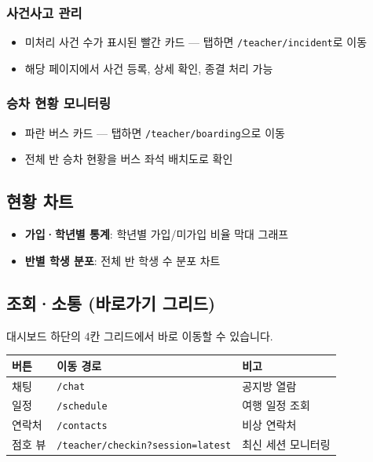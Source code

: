 \documentclass[a4paper,11pt]{article}
\begin{document}
\subsubsection{사건사고 관리}

\begin{itemize}
  \item 미처리 사건 수가 표시된 빨간 카드 — 탭하면 \texttt{/teacher/incident}로 이동
  \item 해당 페이지에서 사건 등록, 상세 확인, 종결 처리 가능
\end{itemize}

\subsubsection{승차 현황 모니터링}

\begin{itemize}
  \item 파란 버스 카드 — 탭하면 \texttt{/teacher/boarding}으로 이동
  \item 전체 반 승차 현황을 버스 좌석 배치도로 확인
\end{itemize}

\subsection{현황 차트}

\begin{itemize}
  \item \textbf{가입·학년별 통계}: 학년별 가입/미가입 비율 막대 그래프
  \item \textbf{반별 학생 분포}: 전체 반 학생 수 분포 차트
\end{itemize}

\subsection{조회·소통 (바로가기 그리드)}

대시보드 하단의 4칸 그리드에서 바로 이동할 수 있습니다.

\begin{center}
\begin{tabular}{@{}lll@{}}
  \toprule
  \textbf{버튼} & \textbf{이동 경로} & \textbf{비고} \\
  \midrule
  채팅 & \texttt{/chat} & 공지방 열람 \\
  일정 & \texttt{/schedule} & 여행 일정 조회 \\
  연락처 & \texttt{/contacts} & 비상 연락처 \\
  점호 뷰 & \texttt{/teacher/checkin?session=latest} & 최신 세션 모니터링 \\
  \bottomrule
\end{tabular}
\end{center}
\end{document}
